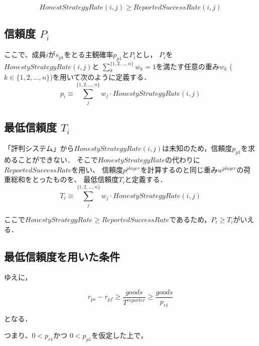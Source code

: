 \begin{equation}
  HonestStrategyRate(i, j) \geq ReportedSuccessRate(i, j)
\end{equation}


\subsection{信頼度 $ P_i $}

ここで、成員$i$が$s_{p1}$をとる主観確率$ p_{p1} $と$P_i$とし，
$ P_i $を$HonestyStrategyRate(i, j)$と
$\sum^{\{1, 2, ..., n\}}_{k}w_k = 1$を満たす任意の重み$ w_k $ ($k \in \{1, 2, ..., n\}$)を用いて次のように定義する． \\

\begin{equation}
  p_i \equiv \sum^{\{1,2,..., n\}}_{j} w_{j} \cdot HonestyStrategyRate(i, j)
\end{equation}


\subsection{最低信頼度 $ T_i $}
「評判システム」から$HonestyStrategyRate(i, j)$は未知のため，信頼度$ p_{p1} $を求めることができない．
そこで$ HonestyStrategyRate $の代わりに$ ReportedSuccessRate $を用い、
信頼度$ p^{player} $を計算するのと同じ重み$ w^{player} $の荷重総和をとったものを、
最低信頼度$ T_i $と定義する． \\

\begin{equation}
  T_i \equiv \sum^{\{1,2,..., n\}}_{j} w_j \cdot HonestyStrategyRate(i, j)
\end{equation}

ここで$ HonestyStrategyRate \geq ReportedSuccessRate $であるため，$ P_i \geq T_i $がいえる．


\subsection{最低信頼度を用いた条件}

ゆえに，

\begin{equation}
  r_{ps} - r_{pf}  \geq \frac{goods}{T^{reporter}} \geq \frac{goods}{p_{r1}}
\end{equation}

となる．

つまり、$ 0<p_{r1} $かつ $ 0 < p_{p1}$を仮定した上で，\\


